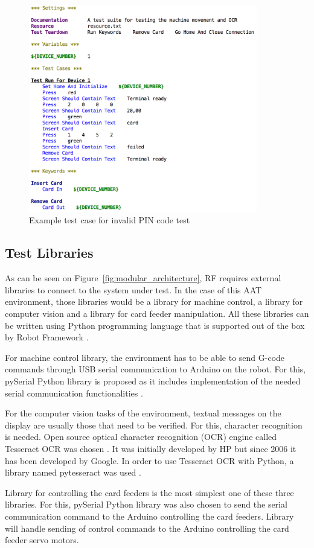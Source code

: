 \begin{figure}[ht]
  \begin{center}
    \includegraphics[width=10cm]{images/example_test.png}
    \caption{Example test case for invalid PIN code test}
    \label{fig:invalid_pin_test}
  \end{center}
\end{figure}

\FloatBarrier
\subsection{Test Libraries}
\label{subsection:test libraries}

As can be seen on Figure~\ref{fig:modular_architecture}, RF requires external libraries to connect to the system under test. In the case of this AAT environment, those libraries would be a library for machine control, a library for computer vision and a library for card feeder manipulation. All these libraries can be written using Python programming language that is supported out of the box by Robot Framework \citep{robotframework}.

For machine control library, the environment has to be able to send G-code commands through USB serial communication to Arduino on the robot. For this, pySerial Python library is proposed as it includes implementation of the needed serial communication functionalities \citep{pyserial}.

For the computer vision tasks of the environment, textual messages on the display are usually those that need to be verified. For this, character recognition is needed. Open source optical character recognition (OCR) engine called Tesseract OCR was chosen \citep{tesseract}. It was initially developed by HP but since 2006 it has been developed by Google. In order to use Tesseract OCR with Python, a library named pytesseract was used \citep{pytesseract}.

Library for controlling the card feeders is the most simplest one of these three libraries. For this, pySerial Python library was also chosen to send the serial communication command to the Arduino controlling the card feeders. Library will handle sending of control commands to the Arduino controlling the card feeder servo motors.